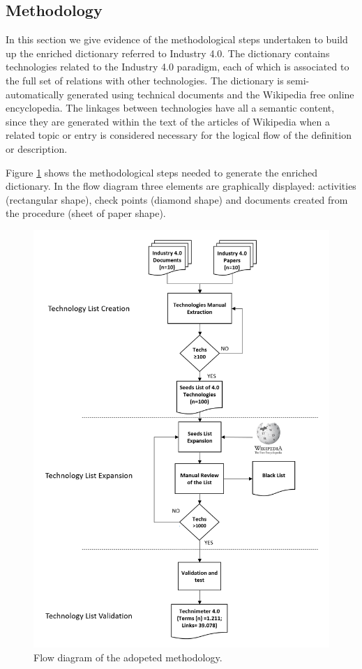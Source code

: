 \documentclass[]{book}
\theoremstyle{definition}
\theoremstyle{definition}
\theoremstyle{definition}
\theoremstyle{remark}
\begin{document}
\subsection{Methodology}\label{methodology-6}

In this section we give evidence of the methodological steps undertaken
to build up the enriched dictionary referred to Industry 4.0. The
dictionary contains technologies related to the Industry 4.0 paradigm,
each of which is associated to the full set of relations with other
technologies. The dictionary is semi-automatically generated using
technical documents and the Wikipedia free online encyclopedia. The
linkages between technologies have all a semantic content, since they
are generated within the text of the articles of Wikipedia when a
related topic or entry is considered necessary for the logical flow of
the definition or description.

Figure \ref{fig:wf40} shows the methodological steps needed to generate
the enriched dictionary. In the flow diagram three elements are
graphically displayed: activities (rectangular shape), check points
(diamond shape) and documents created from the procedure (sheet of paper
shape).

\begin{figure}

{\centering \includegraphics[width=0.8\linewidth]{_bookdown_files/figures/technimeter_03} 

}

\caption{Flow diagram of the adopeted methodology.}\label{fig:wf40}
\end{figure}
\end{document}
